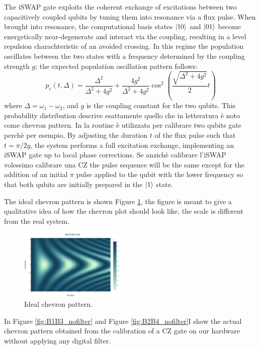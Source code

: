The iSWAP gate exploits the coherent exchange of excitations between two capacitively coupled qubits by tuning them into resonance via a flux pulse. 
When brought into resonance, the computational basis states $\ket{10}$ and $\ket{01}$ become energetically near-degenerate and interact via the coupling, resulting in a level repulsion charachteristic of an avoided crossing.
In this regime the population oscillates between the two states with a frequency determined by the coupling strength $g$; the expected population oscillation pattern follows:
\begin{equation}
    p_e(t, \Delta) = \frac{\Delta^2}{\Delta^2 + 4g^2} + \frac{4g^2}{\Delta^2 + 4g^2} \cos^2\left(\frac{\sqrt{\Delta^2 + 4g^2}}{2}t\right)
\end{equation}
where $\Delta = \omega_1 - \omega_2$, and $g$ is the coupling constant for the two qubits. This probability distribution descrive esattamente quello che in letteratura è noto come chevron pattern.
In \Qibocal la routine è utilizzata per calibrare two qubits gate perchè per esempio, By adjusting the duration $t$ of the flux pulse such that $t=\pi/2g$, the system performs a full excitation exchange, implementing an iSWAP gate up to local phase corrections.
Se anzichè calibrare l'iSWAP volessimo calibrare una CZ the pulse sequence will be the same except for the addition of an initial $\pi$ pulse applied to the qubit with the lower frequency so that both qubits are initially prepared in the $\ket{1}$ state.

The ideal chevron pattern is shown Figure \ref{fig:expected_chevron}, the figure is meant to give a qualitative idea of how the chevron plot should look like, the scale is different from the real system.

\begin{figure}[h!]
    \centering
    \includegraphics[width=0.45\textwidth]{figures/png/IdealChevron.png}
    \caption{Ideal chevron pattern.}
    \label{fig:expected_chevron}
\end{figure}

\newpage
{}
In Figure \ref{fig:B1B3_nofilter} and Figure \ref{fig:B2B4_nofilter}I show the actual chevron pattern obtained from the calibration of a CZ gate on our hardware without applying any digital filter.


